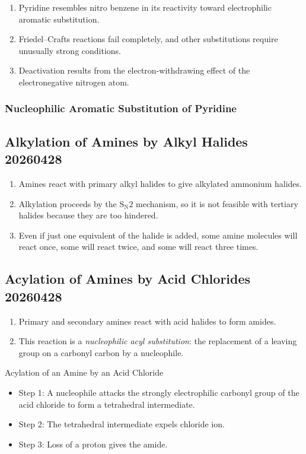 \begin{enumerate}
    \item Pyridine resembles nitro benzene in its reactivity toward electrophilic aromatic substitution.
    \item Friedel–Crafts reactions fail completely, and other substitutions require unusually strong conditions.
    \item Deactivation results from the electron-withdrawing effect of the electronegative nitrogen atom.
\end{enumerate}

\subsubsection{Nucleophilic Aromatic Substitution of Pyridine}

\subsection{Alkylation of Amines by Alkyl Halides 20260428}

\begin{enumerate}
    \item Amines react with primary alkyl halides to give alkylated ammonium halides.
    \item Alkylation proceeds by the $\mathrm{S}_{\mathrm{N}}2$ mechanism, so it is not feasible with tertiary halides because they are too hindered.
    \item Even if just one equivalent of the halide is added, some amine molecules will react once, some will react twice, and some will react three times.
\end{enumerate}

\subsection{Acylation of Amines by Acid Chlorides 20260428}

\begin{enumerate}
    \item Primary and secondary amines react with acid halides to form amides.
    \item This reaction is a \textit{nucleophilic acyl substitution}: the replacement of a leaving group on a carbonyl carbon by a nucleophile.
\end{enumerate}

\begin{mechanism}
    Acylation of an Amine by an Acid Chloride
    \begin{itemize}
        \item Step 1: A nucleophile attacks the strongly electrophilic carbonyl group of the acid chloride to form a tetrahedral intermediate.
        \item Step 2: The tetrahedral intermediate expels chloride ion.
        \item Step 3: Loss of a proton gives the amide.
    \end{itemize}
\end{mechanism}

